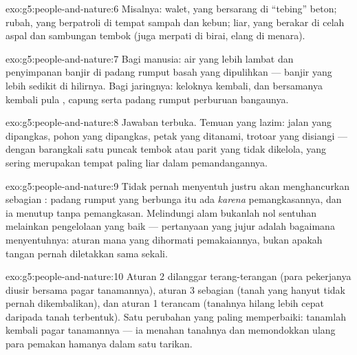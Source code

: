 \begin{solution}{exo:g5:people-and-nature:6}
Misalnya:  walet, yang bersarang di ``tebing'' beton; rubah,
yang berpatroli di tempat sampah dan kebun;  liar, yang
berakar di celah aspal dan sambungan tembok (juga merpati di birai,
elang di menara).
\end{solution}

\begin{solution}{exo:g5:people-and-nature:7}
Bagi manusia: air yang lebih lambat dan penyimpanan banjir di padang
rumput basah yang dipulihkan --- banjir yang lebih sedikit di hilirnya.
Bagi jaringnya:  keloknya kembali, dan bersamanya kembali pula
, capung serta padang rumput perburuan bangaunya.
\end{solution}

\begin{solution}{exo:g5:people-and-nature:8}
Jawaban terbuka. Temuan yang lazim:  jalan yang dipangkas, pohon
yang dipangkas, petak yang ditanami, trotoar yang disiangi --- dengan
barangkali satu puncak tembok atau parit yang tidak dikelola, yang
sering merupakan tempat paling liar dalam pemandangannya.
\end{solution}

\begin{solution}{exo:g5:people-and-nature:9}
Tidak pernah menyentuh justru akan menghancurkan sebagian :
padang rumput yang berbunga itu ada \emph{karena} pemangkasannya, dan
ia menutup tanpa pemangkasan. Melindungi alam bukanlah nol sentuhan
melainkan pengelolaan yang baik --- pertanyaan yang jujur adalah
bagaimana menyentuhnya: aturan mana yang dihormati pemakaiannya,
bukan apakah tangan pernah diletakkan sama sekali.
\end{solution}

\begin{solution}{exo:g5:people-and-nature:10}
Aturan 2 dilanggar terang-terangan (para pekerjanya diusir bersama
pagar tanamannya), aturan 3 sebagian (tanah yang hanyut tidak pernah
dikembalikan), dan aturan 1 terancam (tanahnya hilang lebih cepat
daripada tanah terbentuk). Satu perubahan yang paling memperbaiki:
tanamlah kembali pagar tanamannya --- ia menahan tanahnya dan
memondokkan ulang para pemakan hamanya dalam satu tarikan.
\end{solution}

